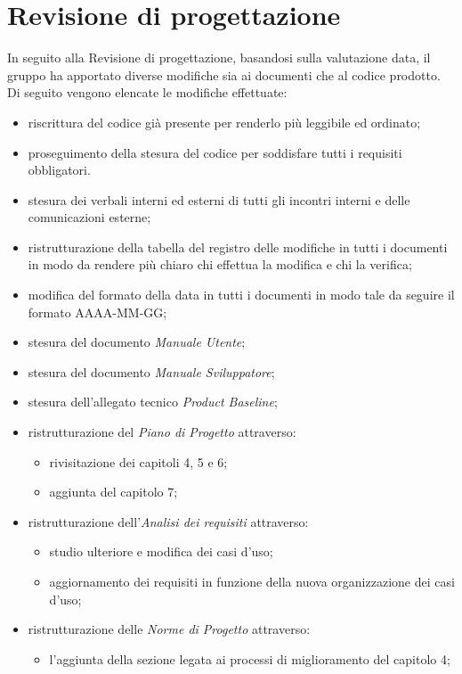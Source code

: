 \section{Revisione di progettazione}\label{EsitiDelleRevisioniRevisioneDiProgettazione}

In seguito alla Revisione di progettazione, basandosi sulla valutazione data, il gruppo ha apportato diverse modifiche sia ai documenti che al codice prodotto. Di seguito vengono elencate le modifiche effettuate:
\begin{itemize}
	\item riscrittura del codice già presente per renderlo più leggibile ed ordinato;
	\item proseguimento della stesura del codice per soddisfare tutti i requisiti obbligatori.
	\item stesura dei verbali interni ed esterni di tutti gli incontri interni e delle comunicazioni esterne;
	\item ristrutturazione della tabella del registro delle modifiche in tutti i documenti in modo da rendere più chiaro chi effettua la modifica e chi la verifica;
	\item modifica del formato della data in tutti i documenti in modo tale da seguire il formato AAAA-MM-GG;
	\item stesura del documento \textit{Manuale Utente};
	\item stesura del documento \textit{Manuale Sviluppatore};
	\item stesura dell'allegato tecnico \textit{Product Baseline};
	\item ristrutturazione del \textit{Piano di Progetto} attraverso:
	\begin{itemize}
		\item rivisitazione dei capitoli 4, 5 e 6;
		\item aggiunta del capitolo 7;
	\end{itemize}
	\item ristrutturazione dell'\textit{Analisi dei requisiti} attraverso:
	\begin{itemize}
		\item studio ulteriore e modifica dei casi d'uso;
		\item aggiornamento dei requisiti in funzione della nuova organizzazione dei casi d'uso;
	\end{itemize}
	\item ristrutturazione delle \textit{Norme di Progetto} attraverso:
	\begin{itemize}
		\item l'aggiunta della sezione legata ai processi di miglioramento del capitolo 4;

\end{itemize}
\end{itemize}
